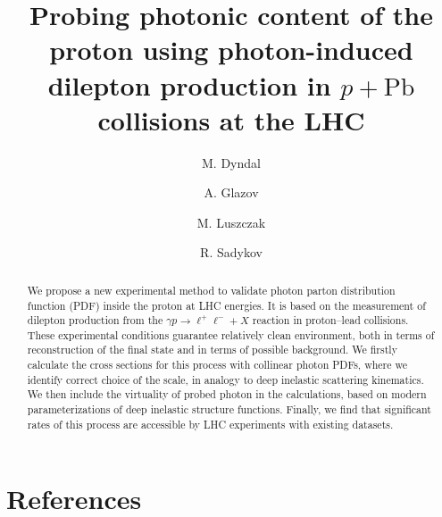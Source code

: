\documentclass[preprint,12pt]{revtex4}
\begin{document}
\title{Probing photonic content of the proton using photon-induced dilepton production in $p+\textrm{Pb}$ collisions at the LHC}


\author{M. Dyndal}
\address{DESY}
\author{A. Glazov}
\address{DESY}
\author{M. Luszczak}
\address{...}
\author{R. Sadykov}
\address{...}



\begin{abstract}
We propose a new experimental method to validate  photon parton distribution function (PDF) inside the proton at LHC energies.
It is based on the measurement of dilepton production from the $\gamma p\rightarrow\ell^+\ell^-+X$ reaction in proton--lead collisions. These experimental conditions guarantee relatively clean environment, both in terms of reconstruction of the final state and in terms of possible background.
We firstly calculate the cross sections for this process with collinear photon PDFs, where we identify correct choice of the scale, in analogy to deep inelastic scattering kinematics.
We then include the virtuality of probed photon in the calculations, based on modern parameterizations of deep inelastic structure functions.
Finally, we find that significant rates of this process are accessible by LHC experiments with existing datasets.
\end{abstract}




\maketitle












\section*{References}


\end{document}

